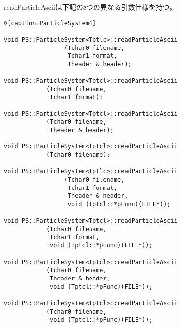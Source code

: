 readParticleAsciiは下記の8つの異なる引数仕様を持つ。
\begin{lstlisting}%[caption=ParticleSystem4]

void PS::ParticleSystem<Tptlc>::readParticleAscii
                 (Tchar0 filename,
                  Tchar1 format,
                  Theader & header);
                  
void PS::ParticleSystem<Tptcl>::readParticleAscii
            (Tchar0 filename,
             Tchar1 format);
             
void PS::ParticleSystem<Tptcl>::readParticleAscii
            (Tchar0 filename,
             Theader & header);
             
void PS::ParticleSystem<Tptcl>::readParticleAscii
            (Tchar0 filename);
            
void PS::ParticleSystem<Tptlc>::readParticleAscii
                 (Tchar0 filename,
                  Tchar1 format,
                  Theader & header,
                  void (Tptcl::*pFunc)(FILE*));
                  
void PS::ParticleSystem<Tptcl>::readParticleAscii
            (Tchar0 filename,
             Tchar1 format,
             void (Tptcl::*pFunc)(FILE*));
             
void PS::ParticleSystem<Tptcl>::readParticleAscii
            (Tchar0 filename,
             Theader & header,
             void (Tptcl::*pFunc)(FILE*));
             
void PS::ParticleSystem<Tptcl>::readParticleAscii
            (Tchar0 filename,
             void (Tptcl::*pFunc)(FILE*));
\end{lstlisting}

